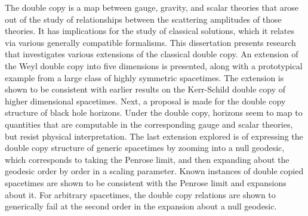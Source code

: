 The double copy is a map between gauge, gravity, and scalar theories that arose out of the study of relationships
between the scattering amplitudes of those theories. It has implications for the study of classical solutions,
which it relates via various generally compatible formalisms. This dissertation presents research that investigates
various extensions of the classical double copy. An extension of the Weyl double copy into five dimensions is
presented, along with a prototypical example from a large class of highly symmetric spacetimes. The extension is
shown to be consistent with earlier results on the Kerr-Schild double copy of higher dimensional spacetimes. Next,
a proposal is made for the double copy structure of black hole horizons. Under the double copy, horizons seem to
map to quantities that are computable in the corresponding gauge and scalar theories, but resist physical
interpretation. The last extension explored is of expressing the double copy structure of generic spacetimes by
zooming into a null geodesic, which corresponds to taking the Penrose limit, and then expanding about the geodesic
order by order in a scaling parameter. Known instances of double copied spacetimes are shown to be consistent with
the Penrose limit and expansions about it. For arbitrary spacetimes, the double copy relations are shown to
generically fail at the second order in the expansion about a null geodesic.
